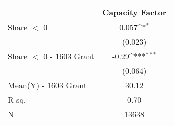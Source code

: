 {
\def\sym#1{\ifmmode^{#1}\else\(^{#1}\)\fi}
\begin{tabular}{l*{1}{c}}
\toprule
                &\multicolumn{1}{c}{Capacity Factor}\\
\midrule
Share $<$ 0     &    0.057\sym{*}  \\
                &  (0.023)         \\
\addlinespace
Share $<$ 0 - 1603 Grant&    -0.29\sym{***}\\
                &  (0.064)         \\
\midrule
Mean(Y) - 1603 Grant&    30.12         \\
R-sq.           &     0.70         \\
N               &    13638         \\
\bottomrule
\end{tabular}
}
